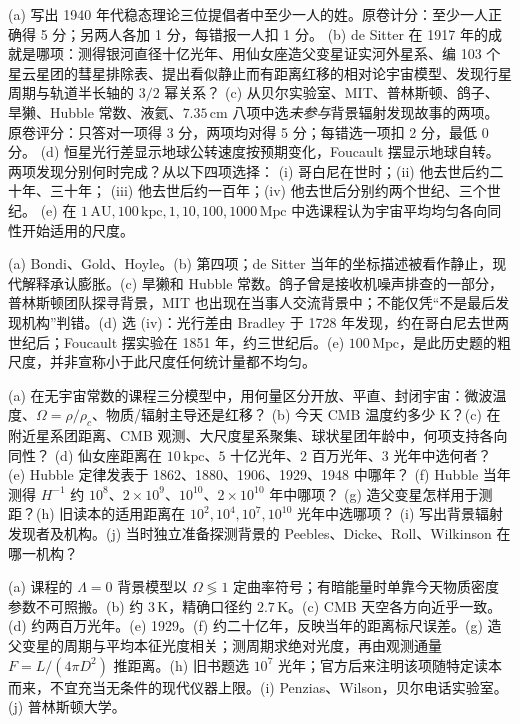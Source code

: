 \begin{exercise}
(a) 写出 1940 年代稳态理论三位提倡者中至少一人的姓。原卷计分：至少一人正确得 5 分；另两人各加 1 分，每错报一人扣 1 分。
(b) de Sitter 在 1917 年的成就是哪项：测得银河直径十亿光年、用仙女座造父变星证实河外星系、编 103 个星云星团的彗星排除表、提出看似静止而有距离红移的相对论宇宙模型、发现行星周期与轨道半长轴的 $3/2$ 幂关系？
(c) 从贝尔实验室、MIT、普林斯顿、鸽子、旱獭、Hubble 常数、液氦、$7.35\,\mathrm{cm}$ 八项中选\emph{未参与}背景辐射发现故事的两项。原卷评分：只答对一项得 3 分，两项均对得 5 分；每错选一项扣 2 分，最低 0 分。
(d) 恒星光行差显示地球公转速度按预期变化，Foucault 摆显示地球自转。两项发现分别何时完成？从以下四项选择：
(i) 哥白尼在世时；(ii) 他去世后约二十年、三十年；
(iii) 他去世后约一百年；(iv) 他去世后分别约两个世纪、三个世纪。
(e) 在 $1\,\mathrm{AU},100\,\mathrm{kpc},1,10,100,1000\,\mathrm{Mpc}$ 中选课程认为宇宙平均均匀各向同性开始适用的尺度。
\end{exercise}
\begin{solution}
(a) Bondi、Gold、Hoyle。(b) 第四项；de Sitter 当年的坐标描述被看作静止，现代解释承认膨胀。(c) 旱獭和 Hubble 常数。鸽子曾是接收机噪声排查的一部分，普林斯顿团队探寻背景，MIT 也出现在当事人交流背景中；不能仅凭“不是最后发现机构”判错。(d) 选 (iv)：光行差由 Bradley 于 1728 年发现，约在哥白尼去世两世纪后；Foucault 摆实验在 1851 年，约三世纪后。(e) $100\,\mathrm{Mpc}$，是此历史题的粗尺度，并非宣称小于此尺度任何统计量都不均匀。
\end{solution}

\begin{exercise}
(a) 在无宇宙常数的课程三分模型中，用何量区分开放、平直、封闭宇宙：微波温度、$\Omega=\rho/\rho_c$、物质/辐射主导还是红移？
(b) 今天 CMB 温度约多少 K？(c) 在附近星系团距离、CMB 观测、大尺度星系聚集、球状星团年龄中，何项支持各向同性？
(d) 仙女座距离在 $10\,\mathrm{kpc}$、$5$ 十亿光年、$2$ 百万光年、$3$ 光年中选何者？
(e) Hubble 定律发表于 1862、1880、1906、1929、1948 中哪年？
(f) Hubble 当年测得 $H^{-1}$ 约 $10^8$、$2\times10^9$、$10^{10}$、$2\times10^{10}$ 年中哪项？
(g) 造父变星怎样用于测距？(h) 旧读本的适用距离在 $10^2,10^4,10^7,10^{10}$ 光年中选哪项？
(i) 写出背景辐射发现者及机构。(j) 当时独立准备探测背景的 Peebles、Dicke、Roll、Wilkinson 在哪一机构？
\end{exercise}
\begin{solution}
(a) 课程的 $\Lambda=0$ 背景模型以 $\Omega\lessgtr1$ 定曲率符号；有暗能量时单靠今天物质密度参数不可照搬。(b) 约 $3\,\mathrm K$，精确口径约 $2.7\,\mathrm K$。(c) CMB 天空各方向近乎一致。(d) 约两百万光年。(e) 1929。(f) 约二十亿年，反映当年的距离标尺误差。(g) 造父变星的周期与平均本征光度相关；测周期求绝对光度，再由观测通量 $F=L/(4\pi D^2)$ 推距离。(h) 旧书题选 $10^7$ 光年；官方后来注明该项随特定读本而来，不宜充当无条件的现代仪器上限。(i) Penzias、Wilson，贝尔电话实验室。(j) 普林斯顿大学。
\end{solution}

